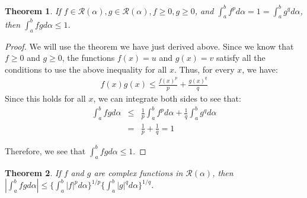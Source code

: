 \documentclass[psamsfonts]{amsart}
\newtheorem{thm}{Theorem}[section]
\theoremstyle{definition}
\theoremstyle{remark}
\numberwithin{equation}{section}
\begin{document}
\begin{thm}
If $f \in \mathscr{R}(\alpha), g \in\mathscr{R}(\alpha), f \geq 0, g \geq 0$, and $\int_a^b f^p d \alpha = 1 = \int_a^b g^q d \alpha$, then $\int_a^b f g d \alpha \leq 1$. 
\end{thm}

\begin{proof}
We will use the theorem we have just derived above. Since we know that $f \geq 0$ and $g \geq 0$, the functions $f(x) = u$ and $g(x) = v$ satisfy all the conditions to use the above inequality for all $x$. Thus, for every $x$, we have:
\begin{eqnarray}
f(x) g(x) \leq \frac{f(x)^p}{p} + \frac{g(x)^q}{q}
\end{eqnarray}
 Since this holds for all $x$, we can integrate both sides to see that:
\begin{eqnarray}
\int_a^b fg d \alpha &\leq& \frac{1}{p}\int_a^b f^p d \alpha + \frac{1}{q} \int_a^b g^q d \alpha \\
& = & \frac{1}{p} + \frac{1}{q} = 1
\end{eqnarray}

Therefore, we see that $\int_a^b fg d \alpha \leq 1$. 
\end{proof}

\begin{thm}
If $f$ and $g$ are complex functions in $\mathscr{R}(\alpha)$, then $|\int_a^b fg d \alpha| \leq \{ \int_a^b |f|^p d \alpha \}^{1/p} \{ \int_a^b |g|^q d \alpha \}^{1/q}$.
\end{thm}
\end{document}
